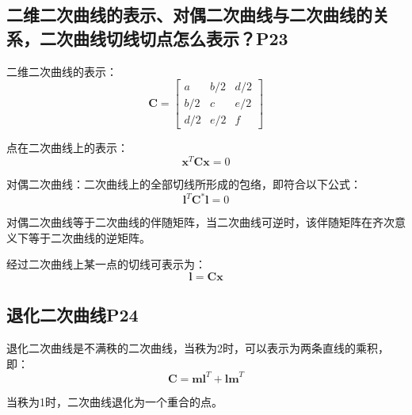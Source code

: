 \documentclass[11pt]{article}
\begin{document}
\subsection{二维二次曲线的表示、对偶二次曲线与二次曲线的关系，二次曲线切线切点怎么表示？P23}
二维二次曲线的表示：
\begin{equation*}
  \mathbold{C}=\begin{bmatrix}
    a   & b/2 & d/2 \\
    b/2 & c   & e/2 \\
    d/2 & e/2 & f
  \end{bmatrix}
\end{equation*}\par
点在二次曲线上的表示：
\begin{equation*}
  \mathbold{x}^T\mathbold{C}\mathbold{x}=0
\end{equation*}\par
对偶二次曲线：二次曲线上的全部切线所形成的包络，即符合以下公式：
\begin{equation*}
  \mathbold{l}^T\mathbold{C}^*\mathbold{l}=0
\end{equation*}\par
对偶二次曲线等于二次曲线的伴随矩阵，当二次曲线可逆时，该伴随矩阵在齐次意义下等于二次曲线的逆矩阵。\par
经过二次曲线上某一点的切线可表示为：
\begin{equation*}
  \mathbold{l=Cx}
\end{equation*}
\subsection{退化二次曲线P24}
退化二次曲线是不满秩的二次曲线，当秩为2时，可以表示为两条直线的乘积，即：
\begin{equation*}
  \mathbold{C}=\mathbold{ml}^T+\mathbold{lm}^T
\end{equation*}\par
当秩为1时，二次曲线退化为一个重合的点。
\end{document}
